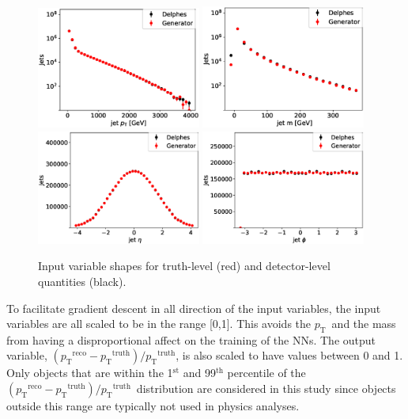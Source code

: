 \documentclass[showpacs,showkeys,preprint,prd,nofootinbib,linenumbers,12pt,superscriptaddress]{revtex4-1}
\def\pt{\ensuremath{p_{\mathrm{T}}}}
\def\ptRes{\ensuremath{(\pt^{\mathrm{reco}}-\pt^{\mathrm{truth}})/\pt^{\mathrm{truth}}}}
\begin{document}
\begin{figure}[h]
  \includegraphics[width=0.48\textwidth]{figures/nn/jet_pT_prescaling_log.eps}
  \includegraphics[width=0.48\textwidth]{figures/nn/jet_m_prescaling_log.eps}\\
  \includegraphics[width=0.48\textwidth]{figures/nn/jet_eta_prescaling.eps}
  \includegraphics[width=0.48\textwidth]{figures/nn/jet_phi_prescaling.eps}
  \caption{Input variable shapes for truth-level (red) and detector-level quantities (black).}
  \label{fig:nnInputsPrescaling}
\end{figure}

To facilitate gradient descent in all direction of the input variables, the input variables are all scaled to be in the range [0,1]. This avoids the \pt\ and the mass from having a disproportional affect on the training of the NNs. The output variable, \ptRes, is also scaled to have values between 0 and 1. Only objects that 
are within the 1$^{\mathrm{st}}$ and 99$^{\mathrm{th}}$ percentile of the \ptRes\ distribution are considered in this study since objects outside this range are typically not used in physics analyses.
\end{document}
